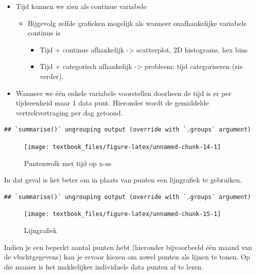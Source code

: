 \documentclass[]{tufte-book}
\providecommand{\tightlist}{%
  \setlength{\itemsep}{0pt}\setlength{\parskip}{0pt}}
\begin{document}
\begin{itemize}
\tightlist
\item
  Tijd kunnen we zien als continue variabele

  \begin{itemize}
  \tightlist
  \item
    Bijgevolg zelfde grafieken mogelijk als wanneer onafhankelijke variabele continue is

    \begin{itemize}
    \tightlist
    \item
      Tijd + continue afhankelijk -\textgreater{} scatterplot, 2D histograms, hex bins
    \item
      Tijd + categorisch afhankelijk -\textgreater{} probleem: tijd categoriseren (zie verder).
    \end{itemize}
  \end{itemize}
\item
  Wanneer we één enkele variabele voorstellen doorheen de tijd is er per tijdseenheid maar 1 data punt. Hieronder wordt de gemiddelde vertrekvertraging per dag getoond.
\end{itemize}

\begin{verbatim}
## `summarise()` ungrouping output (override with `.groups` argument)
\end{verbatim}

\begin{figure}
\texttt{[image: textbook\_files/figure-latex/unnamed-chunk-14-1]} \caption[Puntenwolk met tijd op x-as]{Puntenwolk met tijd op x-as}\label{fig:unnamed-chunk-14}
\end{figure}

In dat geval is het beter om in plaats van punten een lijngrafiek te gebruiken.

\begin{verbatim}
## `summarise()` ungrouping output (override with `.groups` argument)
\end{verbatim}

\begin{figure}
\texttt{[image: textbook\_files/figure-latex/unnamed-chunk-15-1]} \caption[Lijngrafiek]{Lijngrafiek}\label{fig:unnamed-chunk-15}
\end{figure}

Indien je een beperkt aantal punten hebt (hieronder bijvoorbeeld één maand van de vluchtgegevens) kan je ervoor kiezen om zowel punten als lijnen te tonen. Op die manier is het makkelijker individuele data punten af te lezen.
\end{document}

